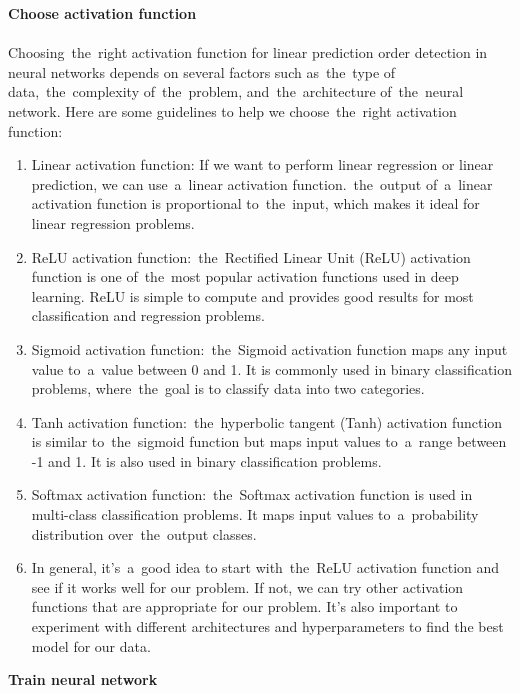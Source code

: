         \textbf{Choose activation function}\\
        \\
        Choosing~the~right activation function for linear prediction order detection in neural networks depends on
        several factors such as~the~type of data,~the~complexity of~the~problem, and~the~architecture of~the~neural
        network. Here are some guidelines to help we choose~the~right activation function:
        \begin{enumerate}
            \item Linear activation function: If we want to perform linear regression or linear prediction, we can
            use~a~linear activation function.~the~output of~a~linear activation function is proportional to~the~input,
            which makes it ideal for linear regression problems.
            \item ReLU activation function:~the~Rectified Linear Unit (ReLU) activation function is one of~the~most
            popular activation functions used in deep learning. ReLU is simple to compute and provides good results
            for most classification and regression problems.
            \item Sigmoid activation function:~the~Sigmoid activation function maps any input value to~a~value
            between 0 and 1. It is commonly used in binary classification problems, where~the~goal is to classify
            data into two categories.
            \item Tanh activation function:~the~hyperbolic tangent (Tanh) activation function is similar to~the~sigmoid
            function but maps input values to~a~range between -1 and 1. It is also used in binary classification problems.
            \item Softmax activation function:~the~Softmax activation function is used in multi-class classification
            problems. It maps input values to~a~probability distribution over~the~output classes.
            \item In general, it's~a~good idea to start with~the~ReLU activation function and see if it works well
            for our problem. If not, we can try other activation functions that are appropriate for our problem.
            It's also important to experiment with different architectures and hyperparameters to find the
            best model for our data.
        \end{enumerate}
        \textbf{Train neural network}\\
        \\
